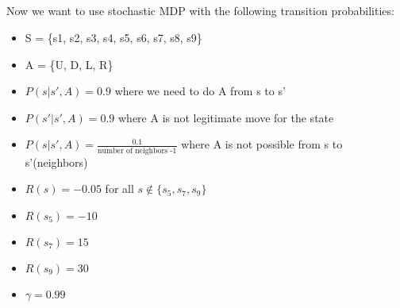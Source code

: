 \documentclass{article}
\begin{document}
\subsection{}
Now we want to use stochastic MDP with the following transition probabilities:
\begin{itemize}
    \item S = \{s1, s2, s3, s4, s5, s6, s7, s8, s9\}
    \item A = \{U, D, L, R\}
    \item $P(s|s',A) = 0.9$ where we need to do A from s to s'
    \item $P(s'|s',A) = 0.9 $ where A is not legitimate move for the state 
    \item $P(s|s',A) = \frac{0.1}{\text{number of neighbors -1}}$ where A is not possible from s to s'(neighbors)
    \item $R(s) = -0.05$ for all $s\not\in \{s_5,s_7,s_9\}$
    \item $R(s_5) = -10$ 
    \item $R(s_7) = 15$ 
    \item $R(s_9) = 30$
    \item $\gamma = 0.99$
\end{itemize}
\end{document}
